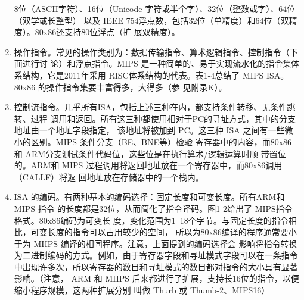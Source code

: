 \begin{enumerate}
    8位（ASCII字符）、16位（Unicode 字符或半个字）、32位（整数或字）、64位（双学或长整型）
    以及 IEEE 754浮点数，包括32位（单精度）和64位（双精度）。80x86还支持80位浮点（扩
    展双精度）。
    \item 操作指令。常见的操作类别为：数据传输指令、算术逻辑指令、控制指令（下面进行讨
    论）和浮点指令。MIPS 是一种简单的、易于实现流水化的指令集体系结构，它是2011年采用
    RISC体系结构的代表。表1-4总结了 MIPS ISA。80x86 的操作指令集要丰富得多，大得多（参
    见附录K）。
    \item 控制流指令。几乎所有ISA，包括上述三种在内，都支持条件转移、无条件跳转、过程
    调用和返回。所有这三种都使用相对于PC的寻址方式，其中的分支地址由一个地址字段指定，
    该地址将被加到 PC。这三种 ISA 之间有一些微小的区别。MIPS 条件分支（BE、BNE等）检验
    寄存器中的内容，而80x86 和 ARM分支测试条件代码位，这些位是在执行算术/逻辑运算时顺
    带置位的。ARM和 MIPS 过程调用将返回地址放在一个寄存器中，而80x86调用（CALLF）将返
    回地址放在存储器中的一个栈内。
    \item ISA 的编码。有两种基本的编码选择：固定长度和可变长度。所有ARM和 MIPS 指令
    的长度都是32位，从而简化了指令译码。图1-2给出了 MIPS指令格式。80x86编码为可变长
    度，变化范围为1~18个字节。与固定长度的指令相比，可变长度的指令可以占用较少的空间，
    所以为80x86编译的程序通常要小于为 MIIPS 编译的相同程序。注意，上面提到的编码选择会
    影响将指令转换为二进制编码的方式。例如，由于寄存器字段和寻址模式字段可以在一条指令
    中出现许多次，所以寄存器的数目和寻址模式的数目都对指令的大小具有显著影响。（注意，
    ARM 和 MIIPS 后来都进行了扩展，支持长16位的指令，以便缩小程序规模，这两种扩展分别
    叫做 Thurb 或 Thumb-2、MIPS16）
\end{enumerate}

